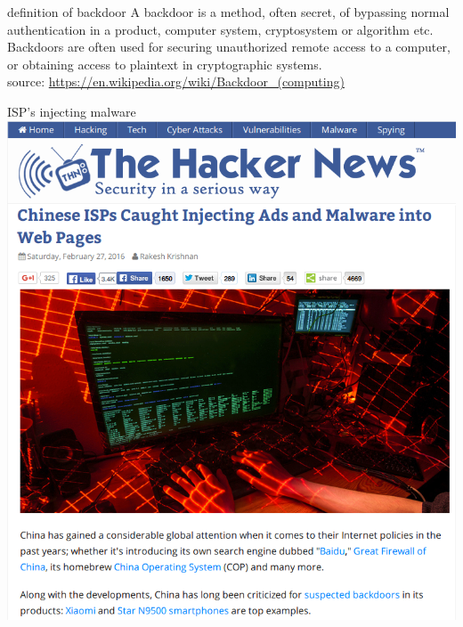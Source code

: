 \documentclass[11pt]{beamer}
\begin{document}
\begin{frame}{definition of backdoor}
A backdoor is a method, often secret, of bypassing normal authentication in a product, computer system, cryptosystem or algorithm etc.
\\[0.2cm]
Backdoors are often used for securing unauthorized remote access to a computer, or obtaining access to plaintext in cryptographic systems.
\\[0.2cm]
source: \href{https://en.wikipedia.org/wiki/Backdoor\textunderscore(computing)}{https://en.wikipedia.org/wiki/Backdoor\_(computing)}
\end{frame}

\begin{frame}{ISP's injecting malware}
\includegraphics[scale=0.28]{isp_malware.png}
\end{frame}
\end{document}
